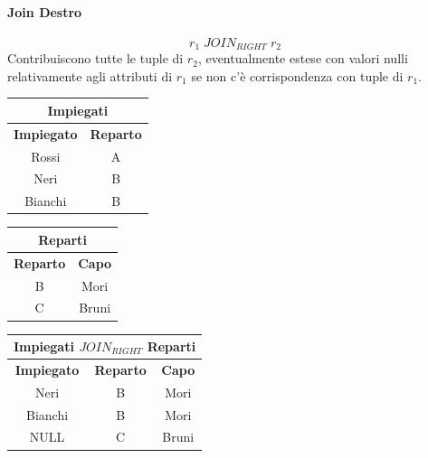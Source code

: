\documentclass[../main.tex]{subfiles}
\begin{document}
	\paragraph{Join Destro}
	\[r_1 \; JOIN_{RIGHT} \; r_2\]
	Contribuiscono tutte le tuple di $r_2$, eventualmente estese con valori nulli relativamente agli attributi di $r_1$ se non c’è corrispondenza con tuple di $r_1$.
	\begin{center}
		\begin{tabular}{ |c|c| }
			\hline
			\multicolumn{2}{|c|}{Impiegati}\\
			\hline
			\textbf{Impiegato} & \textbf{Reparto}\\
			\hline
			Rossi & A\\
			Neri & B\\
			Bianchi & B\\
			\hline
		\end{tabular}
		\begin{tabular}{ |c|c| }
			\hline
			\multicolumn{2}{|c|}{Reparti}\\
			\hline
			\textbf{Reparto} & \textbf{Capo}\\
			\hline
			B & Mori \\
			C & Bruni \\
			\hline
		\end{tabular}
	\end{center}
	\begin{center}
		\begin{tabular}{ |c|c|c| }
			\hline
			\multicolumn{3}{|c|}{Impiegati $JOIN_{RIGHT}$ Reparti}\\
			\hline
			\textbf{Impiegato} & \textbf{Reparto} & \textbf{Capo}\\
			\hline
			Neri & B & Mori\\
			Bianchi & B & Mori\\
			NULL & C & Bruni\\
			\hline
		\end{tabular}
	\end{center}
\end{document}
